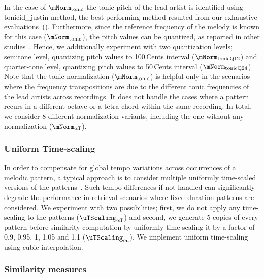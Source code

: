 In the case of $\mNorm_{\mathrm{tonic}}$ the tonic pitch of the lead artist is identified using \acrshort{tonicid_justin} method, the best performing method resulted from our exhaustive evaluations~(). Furthermore, since the reference frequency of the melody is known for this case ($\mNorm_{\mathrm{tonic}}$), the pitch values can be quantized, as reported in other studies~\citep{Ross2012b}. Hence, we additionally experiment with two quantization levels; semitone level, quantizing pitch values to 100\,Cents interval ($\mNorm_{\mathrm{tonicQ12}}$) and quarter-tone level,  quantizing pitch values to 50\,Cents interval ($\mNorm_{\mathrm{tonicQ24}}$). Note that the tonic normalization ($\mNorm_{\mathrm{tonic}}$) is helpful only in the scenarios where the frequency transpositions are due to the different tonic frequencies of the lead artists across recordings. It does not handle the cases where a pattern recurs in a different octave or a tetra-chord within the same recording. In total, we consider 8 different normalization variants, including the one without any normalization ($\mNorm_{\mathrm{off}}$). 


\subsubsection{Uniform Time-scaling}
\label{sec:patterns_melodic_similarity_time_scaling}

In order to compensate for global tempo variations across occurrences of a melodic pattern, a typical approach is to consider multiple uniformly time-scaled versions of the patterns~\citep{mazzoni2001melody,zhu2003query,kotsifakos2012survey}. Such tempo differences if not handled can significantly degrade the performance in retrieval scenarios where fixed duration patterns are considered. We experiment with two possibilities; first,  we do not apply any time-scaling to the patterns ($\uTScaling_{\mathrm{off}}$) and second, we generate 5 copies of every pattern before similarity computation by uniformly time-scaling it by a factor of 0.9, 0.95, 1, 1.05 and 1.1 ($\uTScaling_{\mathrm{on}}$). We implement uniform time-scaling using cubic interpolation. 


\subsubsection{Similarity measures}
\label{sec:patterns_melodic_similarity_dissimilarity measures}

